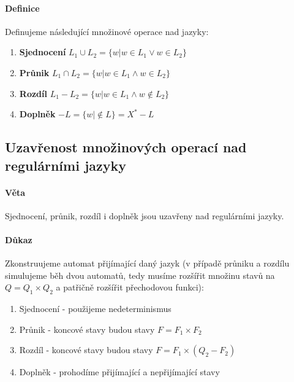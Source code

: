 \documentclass[a4paper,12pt,titlepage]{article}
\begin{document}
\paragraph{Definice}
Definujeme následující množinové operace nad jazyky:
\begin{enumerate}
	\item \textbf{Sjednocení} 
		$L_1 \cup L_2 = \{ w | w \in L_1 \lor w \in L_2 \}$
	\item \textbf{Průnik} 
		$L_1 \cap L_2 = \{ w | w \in L_1 \land w \in L_2 \}$
	\item \textbf{Rozdíl} 
		$L_1 - L_2 = \{ w | w \in L_1 \land w \nin L_2 \}$
	\item \textbf{Doplněk} 
		$- L = \{ w | \nin L \} = X^* - L$
\end{enumerate}
\subsection{Uzavřenost množinových operací nad regulárními jazyky}
\setcounter{equation}{0}
\paragraph{Věta}
Sjednocení, průnik, rozdíl i doplněk jsou uzavřeny nad regulárními jazyky.
\paragraph{Důkaz}
Zkonstruujeme automat přijímající daný jazyk (v případě průniku a rozdílu
simulujeme běh dvou automatů, tedy musíme rozšířit množinu stavů na $Q =
Q_1 \times Q_2$ a patřičně rozšířit přechodovou funkci):
\begin{enumerate}
	\item Sjednocení - použijeme nedeterminismus
	\item Průnik - koncové stavy budou stavy $F = F_1 \times F_2$
	\item Rozdíl - koncové stavy budou stavy $F = F_1 \times (Q_2 - F_2)$
	\item Doplněk - prohodíme přijímající a nepřijímající stavy
\end{enumerate}
\end{document}
